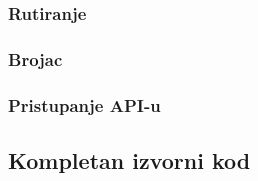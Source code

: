 \documentclass{viser-thesis}
\begin{document}
\subsubsection{Rutiranje}
\subsubsection{Brojac}
\subsubsection{Pristupanje API-u}

\subsection{Kompletan izvorni kod}

\newpage

\printindex
\newpage

\printbibliography[heading=bibintoc]
\end{document}
